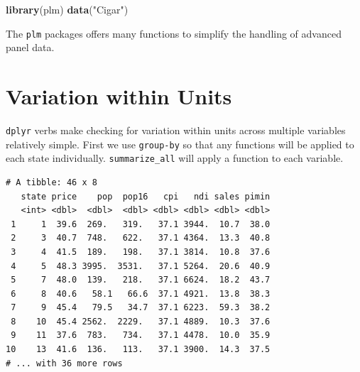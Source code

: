 \documentclass[]{book}
\newenvironment{Shaded}{\begin{snugshade}}{\end{snugshade}}
\newcommand{\CommentTok}[1]{\textcolor[rgb]{0.56,0.35,0.01}{\textit{#1}}}
\newcommand{\KeywordTok}[1]{\textcolor[rgb]{0.13,0.29,0.53}{\textbf{#1}}}
\newcommand{\NormalTok}[1]{#1}
\newcommand{\OperatorTok}[1]{\textcolor[rgb]{0.81,0.36,0.00}{\textbf{#1}}}
\newcommand{\StringTok}[1]{\textcolor[rgb]{0.31,0.60,0.02}{#1}}
\begin{document}
\begin{Shaded}
\begin{Highlighting}[]
\KeywordTok{library}\NormalTok{(plm)}
\KeywordTok{data}\NormalTok{(}\StringTok{"Cigar"}\NormalTok{)}
\end{Highlighting}
\end{Shaded}

The \texttt{plm} packages offers many functions to simplify the handling of advanced panel data.

\hypertarget{variation-within-units}{%
\section{Variation within Units}\label{variation-within-units}}

\texttt{dplyr} verbs make checking for variation within units across multiple variables relatively simple. First we use \texttt{group-by} so that any functions will be applied to each state individually. \texttt{summarize\_all} will apply a function to each variable.

\begin{Shaded}
\end{Shaded}

\begin{verbatim}
# A tibble: 46 x 8
   state price    pop  pop16   cpi   ndi sales pimin
   <int> <dbl>  <dbl>  <dbl> <dbl> <dbl> <dbl> <dbl>
 1     1  39.6  269.   319.   37.1 3944.  10.7  38.0
 2     3  40.7  748.   622.   37.1 4364.  13.3  40.8
 3     4  41.5  189.   198.   37.1 3814.  10.8  37.6
 4     5  48.3 3995.  3531.   37.1 5264.  20.6  40.9
 5     7  48.0  139.   218.   37.1 6624.  18.2  43.7
 6     8  40.6   58.1   66.6  37.1 4921.  13.8  38.3
 7     9  45.4   79.5   34.7  37.1 6223.  59.3  38.2
 8    10  45.4 2562.  2229.   37.1 4889.  10.3  37.6
 9    11  37.6  783.   734.   37.1 4478.  10.0  35.9
10    13  41.6  136.   113.   37.1 3900.  14.3  37.5
# ... with 36 more rows
\end{verbatim}
\end{document}
